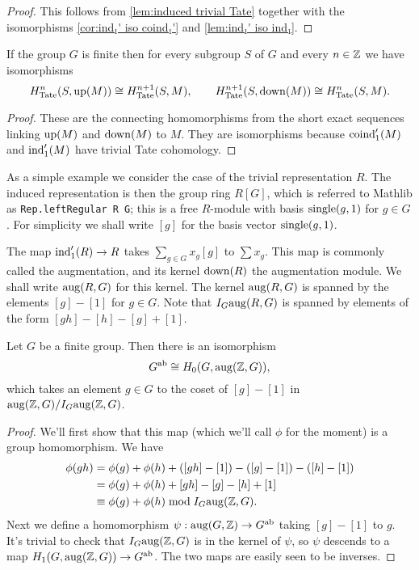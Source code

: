\begin{proof}
	This follows from \ref{lem:induced trivial Tate}
	together with the isomorphisms \ref{cor:ind₁' iso coind₁'} and \ref{lem:ind₁' iso ind₁}.
\end{proof}

\begin{corollary}	\label{cor:Tate up down isos}
	\leanok
	If the group $G$ is finite then for every subgroup $S$ of $G$
	and every $n \in {\mathbb Z}$ we have isomorphisms
	\[
		H^n_{\mathrm{Tate}}(S, \mathrm{up}(M)) \cong H^{n+1}_{\mathrm{Tate}}(S,M),
		\qquad
		H^{n+1}_{\mathrm{Tate}}(S, \mathrm{down}(M)) \cong H^{n}_{\mathrm{Tate}}(S,M).
	\]
\end{corollary}

\begin{proof}
	These are the connecting homomorphisms from the
	short exact sequences linking $\mathrm{up}(M)$ and $\mathrm{down}(M)$ to $M$.
	They are isomorphisms because $\mathrm{coind}_1'(M)$ and $\mathrm{ind}_1'(M)$ have trivial Tate cohomology.
\end{proof}


As a simple example we consider the case of the trivial representation $R$.
The induced representation is then the group ring $R[G]$, which is referred to
Mathlib as \verb|Rep.leftRegular R G|; this is a free $R$-module with basis $\mathrm{single}(g,1)$ for $g \in G$.
For simplicity we shall write $[g]$ for the basis vector $\mathrm{single}(g,1)$.

The map $\mathrm{ind}_1'(R) \to R$ takes $\sum_{g\in G} x_g [g]$ to $\sum x_g$.
This map is commonly called the augmentation, and its kernel $\mathrm{down}(R)$ the augmentation module.
We shall write $\mathrm{aug}(R,G)$ for this kernel.
The kernel $\mathrm{aug}(R,G)$ is spanned by the elements $[g]-[1]$ for $g \in G$.
Note that $I_G \mathrm{aug}(R,G)$ is spanned by elements of the form $[gh]-[h] -[g] + [1]$.

\begin{lemma} \label{lem:homology 0 aug}
	Let $G$ be a finite group.
	Then there is an isomorphism
	\[
		G^{\mathrm{ab}} \cong H_0(G,\mathrm{aug}({\mathbb Z},G)),
	\]
	which takes an element $g \in G$ to the coset of $[g]-[1]$
	in $\mathrm{aug}({\mathbb Z},G) / I_G \mathrm{aug}({\mathbb Z},G)$.
\end{lemma}

\begin{proof}
	We'll first show that this map (which we'll call $\phi$ for the moment) is a group homomorphism.
	We have
	\begin{align*}
		\phi(gh)
		&= \phi(g) +\phi(h) + ([gh]-[1]) -([g]-[1]) - ([h]-[1])\\
		&= \phi(g) +\phi(h) + [gh] - [g] - [h] + [1]\\
		&\equiv \phi(g) +\phi(h) \bmod  I_G \mathrm{aug}({\mathbb Z},G).
	\end{align*}
	Next we define a homomorphism $\psi : \mathrm{aug}(G,{\mathbb Z}) \to G^{\mathrm{ab}}$ taking $[g]-[1]$ to $g$.
	It's trivial to check that $I_G\mathrm{aug}({\mathbb Z},G)$ is in the kernel of $\psi$, so $\psi$ descends to
	a map $H_1(G,\mathrm{aug}({\mathbb Z},G)) \to G^{\mathrm{ab}}$.
	The two maps are easily seen to be inverses.
\end{proof}

